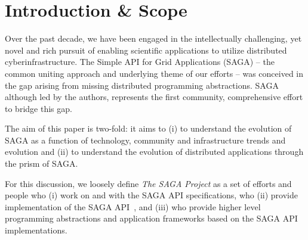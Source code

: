 \documentclass[]{article}
\newcommand{\I}[1]{\textit{#1}}
\begin{document}
\section{Introduction \& Scope }
\label{sec:intro}


Over the past decade, we have been engaged in the intellectually
challenging, yet novel and rich pursuit of enabling scientific
applications to utilize distributed cyberinfrastructure. The Simple
API for Grid Applications (SAGA) -- the common uniting approach and
underlying theme of our efforts -- was conceived in the gap arising
from missing distributed programming abstractions. SAGA although led
by the authors, represents the first community, comprehensive effort
to bridge this gap.

The aim of this paper is two-fold: it aims to (i) to understand the 
evolution of SAGA as a function of technology, community and 
infrastructure trends and evolution and (ii) to understand the evolution 
of distributed applications through the prism of SAGA.

For this discussion, we loosely define \I{The SAGA Project} as a set
of efforts and people who (i) work on and with the SAGA API
specifications\cite{saga-core}, who (ii) provide
implementation of the SAGA API~\cite{saga-c++,jsaga,javasaga},
and (iii) who provide higher level programming abstractions and application frameworks based on the SAGA API implementations\cite{bigjob_cloudcom10}.

 

 
\end{document}
